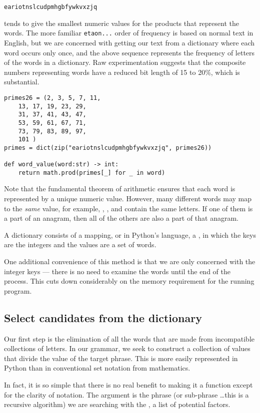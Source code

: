 \documentclass[letterpaper, 11pt]{article}
\begin{document}
\verb|eariotnslcudpmhgbfywkvxzjq|

tends to give the smallest numeric values for the products that represent
the words. The more familiar \verb|etaon...| order of frequency is based
on normal text in English, but we are concerned with getting our
text from a dictionary where each word occurs only once, and the above
sequence represents the frequency of letters of the words in a dictionary.
Raw experimentation suggests that the composite numbers representing
words have a reduced bit length of 15 to 20\%, which is substantial.

\begin{verbatim}
primes26 = (2, 3, 5, 7, 11,
    13, 17, 19, 23, 29,
    31, 37, 41, 43, 47,
    53, 59, 61, 67, 71,
    73, 79, 83, 89, 97,
    101 )
primes = dict(zip("eariotnslcudpmhgbfywkvxzjq", primes26))

def word_value(word:str) -> int:
    return math.prod(primes[_] for _ in word)
\end{verbatim}

Note that the fundamental theorem of arithmetic ensures that each
word is represented by a unique numeric value. However, many different
words may map to the \emph{same} value, for example, , ,
and  contain the same letters. If one of them is a part of
an anagram, then all of the others are also a part of that anagram.

A dictionary consists of a mapping, or in Python's language, a , in
which the keys are the integers and the values are a set of words.

One additional convenience of this method is that we are only concerned
with the integer keys --- there is no need to examine the words until
the end of the process. This cuts down considerably on the memory
requirement for the running program.


\subsection{Select candidates from the dictionary}

Our first step is the elimination of all the words that are made
from incompatible collections of letters. In our grammar, we seek
to construct a collection of values that divide the value of the 
target phrase. This is more easily represented in Python than in 
conventional set notation from mathematics. 

In fact, it is so simple that there is no real benefit to making
it a function except for the clarity of notation. The 
argument is the phrase (or sub-phrase \ldots this is a recursive
algorithm) we are searching with the , a list
of potential factors.
\end{document}
